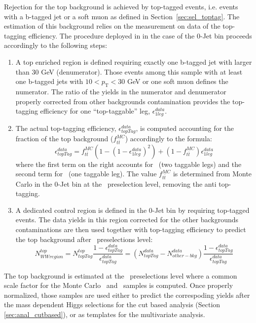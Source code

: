 Rejection for the top background is achieved by top-tagged events,
i.e. events with a b-tagged jet or a soft muon as defined in
Section~\ref{sec:sel_toptag}.  The estimation of this background
relies on the measurement on data of the top-tagging efficiency.  The
procedure deployed in \cite{HWW2011} in the case of the 0-Jet bin
proceeds accordingly to the following steps:
\begin{enumerate}
\item 
A top enriched region is defined requiring exactly one b-tagged jet
with \pt larger than $30$ GeV (denumerator).  Those events among this
sample with at least one b-tagged jets with
$10<\ensuremath{p_\mathrm{T}}<30$ GeV or one soft muon defines the
numerator. The ratio of the yields in the numerator and denumerator
properly corrected from other backgrounds contamination provides the
top-tagging efficiency for one ``top-taggable'' leg,
$\epsilon_{1leg}^{data}$.
\item 
The actual top-tagging efficiency, $\epsilon_{topTag}^{data}$, is
computed accounting for the \ttbar fraction of the top background
($f_{t\bar{t}}^{MC}$) accordingly to the formula:
\begin{equation} \label{eq:oldTopTagEff}
\epsilon_{topTag}^{data} = f_{t\bar{t}}^{MC}(1-(1-\epsilon_{1leg}^{data})^2) + (1-f_{t\bar{t}}^{MC})\epsilon_{1leg}^{data}
\end{equation} 
where the first term on the right accounts for \ttbar\ (two taggable
legs) and the second term for \tw\ (one taggable leg). The value
$f_{t\bar{t}}^{MC}$ is determined from Monte Carlo in the 0-Jet bin at
the \WW\ preselection level, removing the anti top-tagging.
\item 
A dedicated control region is defined in the 0-Jet bin by requiring
top-tagged events.  The data yields in this region corrected for the
other backgrounds contaminations are then used together with
top-tagging efficiency to predict the top background after \WW\
preselections level:
\begin{equation} \label{eq:topExtrapolation}
N^{top}_{WW region}=N_{topTag}^{top}\frac{1-\epsilon_{topTag}^{data}}{\epsilon_{topTag}^{data}} = 
(N_{topTag}^{data}-N_{other-bkg}^{data})\frac{1-\epsilon_{topTag}^{data}}{\epsilon_{topTag}^{data}}
\end{equation} 
\end{enumerate} 

The top background is estimated at the \WW\ preselections level where
a common scale factor for the Monte Carlo \ttbar\ and \tw\ samples is
computed.  Once properly normalized, those samples are used either to
predict the correspoding yields after the mass dependent Higgs
selections for the cut based analysis
(Section \ref{sec:anal_cutbased}), or as templates for the
multivariate analysis.

